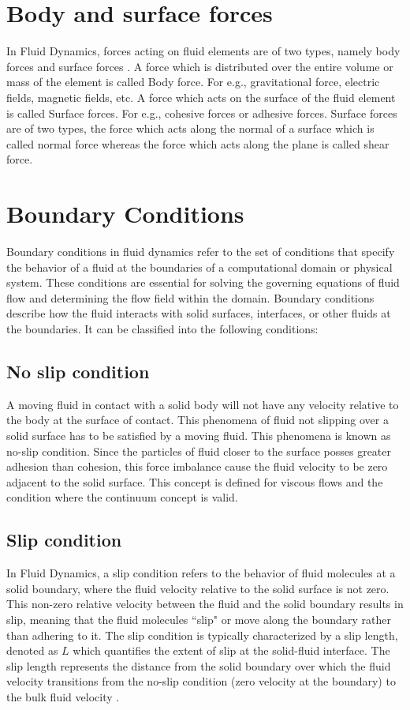\documentclass[14pt,one side, a4paper]{extbook}
\begin{document}
	 \section{Body and surface forces} In Fluid Dynamics, forces acting on fluid elements are of two types, namely body forces and surface forces \cite{warsi}. A force which is distributed over the entire volume or mass of the element is called Body force. For e.g., gravitational force, electric fields, magnetic fields, etc.
	 A force which acts on the surface of the fluid element is called Surface forces. For e.g., cohesive forces or adhesive forces. 
	 Surface forces are of two types, the force which acts along the normal of a surface which is called normal force whereas the force which acts along the plane is called shear force.
	 \section{Boundary Conditions}
	 Boundary conditions in fluid dynamics refer to the set of conditions that specify the behavior of a fluid at the boundaries of a computational domain or physical system. These conditions are essential for solving the governing equations of fluid flow and determining the flow field within the domain. Boundary conditions describe how the fluid interacts with solid surfaces, interfaces, or other fluids at the boundaries.
	 It can be classified into the following conditions:
	 \subsection{No slip condition} A moving fluid in contact with a solid body will not have any velocity relative to the body at the surface of contact. This phenomena of fluid not slipping over a solid surface has to be satisfied by a moving fluid. This phenomena is known as no-slip condition. Since the particles of fluid closer to the surface posses greater adhesion than cohesion, this force imbalance cause the fluid velocity to be zero adjacent to the solid surface. This concept is defined for viscous flows and the condition where the continuum concept is valid.
	 \subsection{Slip condition}
	  In Fluid Dynamics, a  slip condition refers to the behavior of  fluid molecules at a solid boundary, where the fluid velocity relative to the solid surface is not zero. This non-zero relative velocity between the fluid and the solid boundary results in slip, meaning that the fluid molecules ``slip" or move along the boundary rather than adhering to it. The slip condition is typically characterized by a slip length, denoted as $L$ which quantifies the extent of slip at the solid-fluid interface. The slip length represents the distance from the solid boundary over which the fluid velocity transitions from the no-slip condition (zero velocity at the boundary) to the bulk fluid velocity \cite{Lopez,wilson}.
\end{document}
